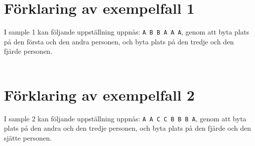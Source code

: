 \section*{Förklaring av exempelfall 1}
I sample 1 kan följande uppställning uppnås: \texttt{A B B A A A}, genom att byta plats på den första och den andra personen, och byta plats på den tredje och den fjärde personen. \\ \\
\section*{Förklaring av exempelfall 2}
I sample 2 kan följande uppställning uppnås: \texttt{A A C C B B B A}, genom att byta plats på den andra och den tredje personen, och byta plats på den fjärde och den sjätte personen. 

